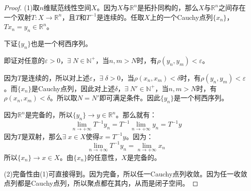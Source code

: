 \begin{proof}
	(1)取$n$维赋范线性空间$X$。因为$X$与$\mathbb{R}^n$是拓扑同构的，那么$X$与$\mathbb{R}^n$之间存在一个双射$T:X\rightarrow\mathbb{R}^n$，且$T$和$T^{-1}$是连续的。任取$X$上的一个Cauchy点列$\{x_n\}$，$Tx_n=y_n\in\mathbb{R}^n$。\par 
	下证$\{y_n\}$也是一个柯西序列。\par
	即证对任意的$\varepsilon>0$，$\exists\;N\in\mathbb{N}^+$，当$n,m>N$时，有$\rho(y_n,y_m)<\varepsilon$。\par
	因为$T$是连续的，所以对上述$\varepsilon$，$\exists\;\delta>0$，当$\rho(x_n,x_m)<\delta$时，有$\rho(y_n,y_m)<\varepsilon$。而$\{x_n\}$是Cauchy点列，因此对上述$\delta$，$\exists\;N'\in\mathbb{N}^+$，当$n,m>N$时，有$\rho(x_n,x_m)<\delta$。所以取$N=N'$即可满足条件。因此$\{y_n\}$是一个柯西序列。\par
	因为$\mathbb{R}^n$是完备的，所以$\{y_n\}\rightarrow y\in\mathbb{R}^n$。那么就有：
	\begin{equation*}
		\lim_{n\to+\infty}T^{-1}y_n=T^{-1}\lim_{n\to+\infty}y_n=T^{-1}y
	\end{equation*}
	因为$T$是双射，那么$\exists\;x\in X$使得$x=T^{-1}y$。因为：
	\begin{equation*}
		\lim_{n\to+\infty}T^{-1}y_n=\lim_{n\to+\infty}x_n
	\end{equation*}
	所以$\{x_n\}\rightarrow x\in X$。由$\{x_n\}$的任意性，$X$是完备的。\par
	(2)完备性由(1)可直接得到。因为完备，所以任一Cauchy点列收敛。因为任一收敛点列都是Cauchy点列，所以聚点都在其内，从而是闭子空间。
\end{proof}
